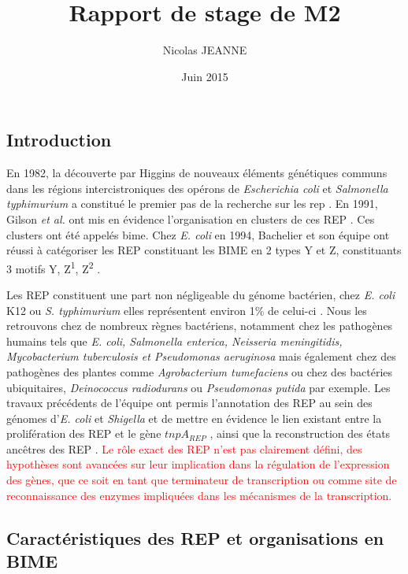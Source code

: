 \documentclass[12pt,a4paper]{report}
\author{Nicolas JEANNE}
\title{Rapport de stage de M2}
\date{Juin 2015}
\begin{document}
\maketitle

\begin{onehalfspace}
\chapter*{Introduction}
En 1982, la découverte par Higgins de nouveaux éléments génétiques communs dans les régions intercistroniques des opérons de \textit{Escherichia coli} et \textit{Salmonella typhimurium} a constitué le premier pas de la recherche sur les \gls{rep} \citep{Higgins1982}. En 1991, Gilson \textit{et al.} ont mis en évidence l'organisation en clusters de ces REP \citep{Gilson1991}. Ces clusters ont été appelés \gls{bime}. Chez \textit{E. coli} en 1994, Bachelier et son équipe ont réussi à catégoriser les REP constituant les BIME en 2 types Y et Z, constituants 3 motifs Y, Z\textsuperscript{1}, Z\textsuperscript{2}  \citep{Bachellier1994}.
 
Les REP constituent une part non négligeable du génome bactérien, chez \textit{E. coli} K12 ou \textit{S. typhimurium} elles représentent environ 1\% de celui-ci \citep{Gilson1991}. Nous les retrouvons chez de nombreux règnes bactériens, notamment chez les pathogènes humains tels que \textit{E. coli, Salmonella enterica, Neisseria meningitidis, Mycobacterium tuberculosis et Pseudomonas aeruginosa} mais également chez des pathogènes des plantes comme \textit{Agrobacterium tumefaciens} ou chez des bactéries ubiquitaires, \textit{Deinococcus radiodurans} ou \textit{Pseudomonas putida} par exemple. Les travaux précédents de l'équipe ont permis l'annotation des REP au sein des génomes d'\textit{E. coli} et \textit{Shigella} et de mettre en évidence le lien existant entre la prolifération des REP et le gène $tnpA_{REP}$ \citep{Weyder2013,Bosc2014}, ainsi que la reconstruction des états ancêtres des REP \citep{Bosc2014}.  \textcolor{red}{Le rôle exact des REP n'est pas clairement défini, des hypothèses sont avancées sur leur implication dans la régulation de l'expression des gènes, que ce soit en tant que terminateur de transcription ou comme site de reconnaissance des enzymes impliquées dans les mécanismes de la transcription.}

\section*{Caractéristiques des REP et organisations en BIME}


\end{onehalfspace}
\end{document}
